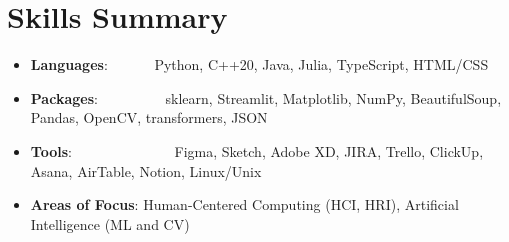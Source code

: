 \documentclass[a4paper,11pt]{extarticle}
\newcommand{\resumeSkillItem}[2]{
	\item\small{
		\textbf{#1}{: #2 \vspace{-2pt}}
	}
}
\newcommand{\resumeSubItem}[2]{\resumeSkillItem{#1}{#2}\vspace{-5pt}}
\newcommand{\resumeSubHeadingListStart}{
    \begin{itemize}[leftmargin=0.15in,label={}]}
\newcommand{\resumeSubHeadingListEnd}{\end{itemize}}
\begin{document}
\section{Skills Summary}
	\resumeSubHeadingListStart
		\resumeSubItem{Languages}
            {\hspace{0.2mm}~~~~~~Python, C++20, Java, Julia, TypeScript, HTML/CSS}
		\resumeSubItem{Packages}
            {\hspace{0.2mm}~~~~~~~~~sklearn, Streamlit, Matplotlib, NumPy, BeautifulSoup, Pandas, OpenCV, transformers, JSON}
            \resumeSubItem{Tools}
            {\hspace{0.2mm}~~~~~~~~~~~~~~Figma, Sketch, Adobe XD, JIRA, Trello, ClickUp, Asana, AirTable, Notion, Linux/Unix}
            \resumeSubItem{Areas of Focus}
            {\hspace{0.2mm}Human-Centered Computing (HCI, HRI), Artificial Intelligence (ML and CV)}          
	\resumeSubHeadingListEnd
\end{document}
